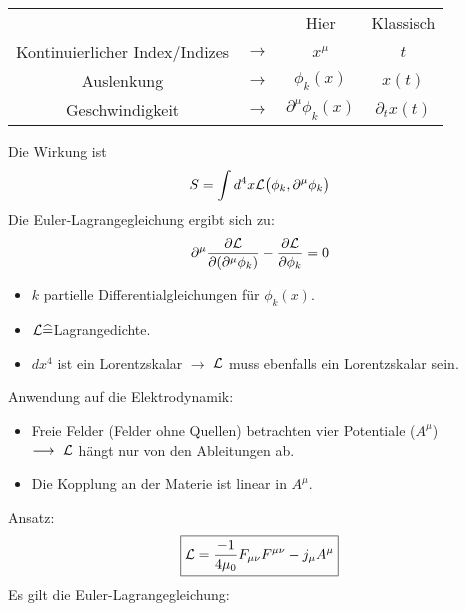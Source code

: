 \begin{center}
\begin{tabular}{ccc|c}
 & &Hier&Klassisch\\
Kontinuierlicher Index/Indizes&$\longrightarrow$&$x^ {\mu}$&$t$\\
Auslenkung&$\longrightarrow$&$\phi_k(x)$&$x(t)$\\
Geschwindigkeit&$\longrightarrow$&$\partial^ {\mu}\phi_k(x)$&$\partial_t x(t)$
\end{tabular}
\end{center}

Die Wirkung ist
\begin{eqnarray*}
S = \int d^ 4x \mathcal L\big(\phi_k,\partial ^ {\mu}\phi_k\big)
\end{eqnarray*}
Die Euler-Lagrangegleichung ergibt sich zu:
\begin{eqnarray*}
\partial^ {\mu} \frac{\partial \mathcal L}{\partial ( \partial^ {\mu}\phi_k)} - \frac{\partial \mathcal L}{\partial \phi_k} = 0
\end{eqnarray*}
\begin{itemize}
\item $k$ partielle Differentialgleichungen für $\phi_k(x)$.
\item $\mathcal L \widehat =$Lagrangedichte.
\item $dx^ 4$ ist ein Lorentzskalar $\longrightarrow$ $\mathcal L$ muss ebenfalls ein Lorentzskalar sein.
\end{itemize}
Anwendung auf die Elektrodynamik:
\begin{itemize}
\item Freie Felder (Felder ohne Quellen) betrachten vier Potentiale ($A^ {\mu}$)\\
$\longrightarrow \ \mathcal L$ hängt nur von den Ableitungen ab.
\item Die Kopplung an der Materie ist linear in $A^ {\mu}$.
\end{itemize}
Ansatz:
\begin{eqnarray*} \boxed{ \mathcal L = \frac {-1}{4\mu_0} F_{\mu\nu}F^ {\mu\nu} - j_{\mu} A^ {\mu}}\end{eqnarray*}
Es gilt die Euler-Lagrangegleichung:
